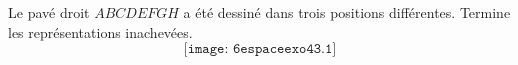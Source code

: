 Le pavé droit $ABCDEFGH$ a été dessiné dans trois positions
différentes. Termine les représentations inachevées.
\[\texttt{[image: 6espaceexo43.1]}\]